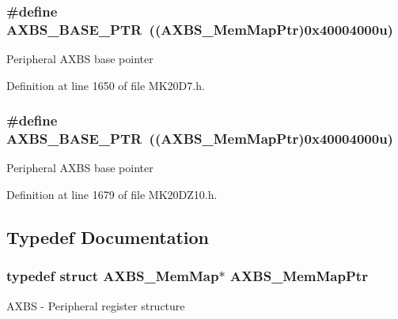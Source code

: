 \subsubsection[{\texorpdfstring{A\+X\+B\+S\+\_\+\+B\+A\+S\+E\+\_\+\+P\+TR}{AXBS_BASE_PTR}}]{\setlength{\rightskip}{0pt plus 5cm}\#define A\+X\+B\+S\+\_\+\+B\+A\+S\+E\+\_\+\+P\+TR~(({\bf A\+X\+B\+S\+\_\+\+Mem\+Map\+Ptr})0x40004000u)}\hypertarget{group___a_x_b_s___peripheral_gacbbf56489b86d1ddb3e0ac291922a56d}{}\label{group___a_x_b_s___peripheral_gacbbf56489b86d1ddb3e0ac291922a56d}
Peripheral A\+X\+BS base pointer 

Definition at line 1650 of file M\+K20\+D7.\+h.

\subsubsection[{\texorpdfstring{A\+X\+B\+S\+\_\+\+B\+A\+S\+E\+\_\+\+P\+TR}{AXBS_BASE_PTR}}]{\setlength{\rightskip}{0pt plus 5cm}\#define A\+X\+B\+S\+\_\+\+B\+A\+S\+E\+\_\+\+P\+TR~(({\bf A\+X\+B\+S\+\_\+\+Mem\+Map\+Ptr})0x40004000u)}\hypertarget{group___a_x_b_s___peripheral_gacbbf56489b86d1ddb3e0ac291922a56d}{}\label{group___a_x_b_s___peripheral_gacbbf56489b86d1ddb3e0ac291922a56d}
Peripheral A\+X\+BS base pointer 

Definition at line 1679 of file M\+K20\+D\+Z10.\+h.



\subsection{Typedef Documentation}
\subsubsection[{\texorpdfstring{A\+X\+B\+S\+\_\+\+Mem\+Map\+Ptr}{AXBS_MemMapPtr}}]{\setlength{\rightskip}{0pt plus 5cm}typedef struct {\bf A\+X\+B\+S\+\_\+\+Mem\+Map}$\ast$ {\bf A\+X\+B\+S\+\_\+\+Mem\+Map\+Ptr}}\hypertarget{group___a_x_b_s___peripheral_ga8f768bd75d5c94d51b05e9ef4a38ea33}{}\label{group___a_x_b_s___peripheral_ga8f768bd75d5c94d51b05e9ef4a38ea33}
A\+X\+BS -\/ Peripheral register structure 
